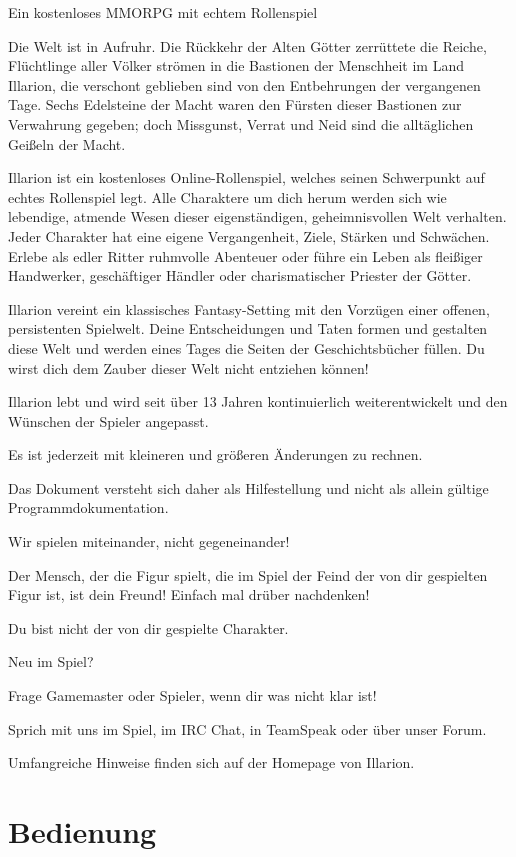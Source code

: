 \documentclass[a4paper,11pt]{book}
\begin{document}
Ein kostenloses MMORPG mit echtem Rollenspiel

Die Welt ist in Aufruhr. Die Rückkehr der Alten Götter zerrüttete die Reiche, Flüchtlinge aller Völker strömen in die Bastionen der Menschheit im Land Illarion, die verschont geblieben sind von den Entbehrungen der vergangenen Tage. Sechs Edelsteine der Macht waren den Fürsten dieser Bastionen zur Verwahrung gegeben; doch Missgunst, Verrat und Neid sind die alltäglichen Geißeln der Macht.

Illarion ist ein kostenloses Online-Rollenspiel, welches seinen Schwerpunkt auf echtes Rollenspiel legt. Alle Charaktere um dich herum werden sich wie lebendige, atmende Wesen dieser eigenständigen, geheimnisvollen Welt verhalten. Jeder Charakter hat eine eigene Vergangenheit, Ziele, Stärken und Schwächen. Erlebe als edler Ritter ruhmvolle Abenteuer oder führe ein Leben als fleißiger Handwerker, geschäftiger Händler oder charismatischer Priester der Götter.

Illarion vereint ein klassisches Fantasy-Setting mit den Vorzügen einer offenen, persistenten Spielwelt. Deine Entscheidungen und Taten formen und gestalten diese Welt und werden eines Tages die Seiten der Geschichtsbücher füllen. Du wirst dich dem Zauber dieser Welt nicht entziehen können!

Illarion lebt und wird seit über 13 Jahren kontinuierlich weiterentwickelt und den Wünschen der Spieler angepasst.

Es ist jederzeit mit kleineren und größeren Änderungen zu rechnen.

Das Dokument versteht sich daher als Hilfestellung und nicht als allein gültige Programmdokumentation.

Wir spielen miteinander, nicht gegeneinander!

Der Mensch, der die Figur spielt, die im Spiel der Feind der von dir gespielten Figur ist, ist dein Freund! Einfach mal drüber nachdenken!

Du bist nicht der von dir gespielte Charakter.

Neu im Spiel?

Frage Gamemaster oder Spieler, wenn dir was nicht klar ist!

Sprich mit uns im Spiel, im IRC Chat, in TeamSpeak oder über unser Forum.

Umfangreiche Hinweise finden sich auf der Homepage von Illarion.

\tableofcontents

\chapter{Bedienung}
\end{document}
